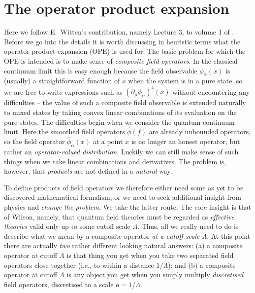 \documentclass[prl,twocolumn,lengthcheck,superscriptaddress]{revtex4-1}
\theoremstyle{definition}
\theoremstyle{remark}
\begin{document}
\section{The operator product expansion}
Here we follow E.\ Witten's contribution, namely Lecture 3, to volume 1 of \cite{deligne:1999a}. Before we go into the details it is worth discussing in heuristic terms what the operator product expansion (OPE) is used for. The basic problem for which the OPE is intended is to make sense of \emph{composite field operators}. In the classical continuum limit this is easy enough because the field observable $\phi_\alpha(x)$ is (usually) a straightforward function of $x$ when the system is in a pure state, so we are free to write expressions such as $(\partial_\mu \phi_\alpha)^4(x)$ without encountering any difficulties -- the value of such a composite field observable is extended naturally to mixed states by taking convex linear combinations of its evaluation on the pure states. The difficulties begin when we consider the quantum continuum limit. Here the smoothed field operators $\widehat{\phi}(f)$ are already unbounded operators, so the field operator $\widehat{\phi}_\alpha(x)$ at a point $x$ is no longer an honest operator, but rather an \emph{operator-valued distribution}. Luckily we can still make sense of such things when we take linear combinations and derivatives. The problem is, however, that \emph{products} are not defined in a \emph{natural} way. 

To define products of field operators we therefore either need some as yet to be discovered mathematical formalism, or we need to seek additional insight from physics and \emph{change the problem}. We take the latter route. The core insight is that of Wilson, namely, that quantum field theories must be regarded as \emph{effective theories} valid only up to some cutoff scale $\Lambda$. Thus, all we really need to do is describe what we mean by a composite operator \emph{at a cutoff scale $\Lambda$}. At this point there are actually \emph{two} rather different looking natural answers: (a) a composite operator at cutoff $\Lambda$ is that thing you get when you take two separated field operators close together (i.e., to within a distance $1/\Lambda$); and (b) a composite operator at cutoff $\Lambda$ is any object you get when you simply multiply \emph{discretised} field operators, discretised to a scale $a = 1/\Lambda$. 
\end{document}
